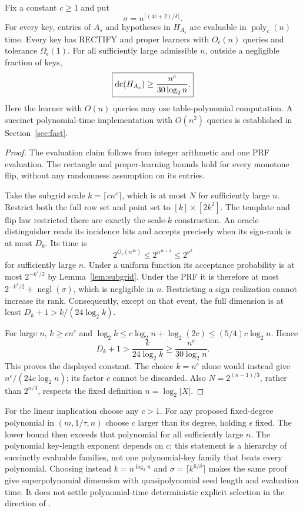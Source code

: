 \begin{samepage}
\begin{theorem}\label{thm:prf}
Fix a constant $c\ge1$ and put
\[
 \sigma=n^{\lceil(4c+2)/\delta\rceil}.
\]
For every key, entries of $A_s$ and hypotheses in $H_{A_s}$ are evaluable in $\operatorname{poly}_c(n)$ time. Every key has RECTIFY and proper learners with $O_\epsilon(n)$ queries and tolerance $\Omega_\epsilon(1)$. For all sufficiently large admissible $n$, outside a negligible fraction of keys,
\[
 \boxed{\operatorname{dc}(H_{A_s})\ge\frac{n^c}{30\log_2n}.}
\]
Here the learner with $O(n)$ queries may use table-polynomial computation. A succinct polynomial-time implementation with $O(n^2)$ queries is established in Section~\ref{sec:fast}.
\end{theorem}
\end{samepage}
\begin{proof}
The evaluation claim follows from integer arithmetic and one PRF evaluation. The rectangle and proper-learning bounds hold for every monotone flip, without any randomness assumption on its entries.

Take the subgrid scale $k=\lceil c n^c\rceil$, which is at most $N$ for sufficiently large $n$. Restrict both the full row set and point set to $[k]\times[2k^2]$. The template and flip law restricted there are exactly the scale-$k$ construction. An oracle distinguisher reads its incidence bits and accepts precisely when its sign-rank is at most $D_k$. Its time is
\[
 2^{O_c(n^{4c})}\le2^{n^{4c+2}}\le2^{\sigma^\delta}
\]
for sufficiently large $n$. Under a uniform function its acceptance probability is at most $2^{-k^4/2}$ by Lemma~\ref{lem:subgrid}. Under the PRF it is therefore at most $2^{-k^4/2}+\operatorname{negl}(\sigma)$, which is negligible in $n$. Restricting a sign realization cannot increase its rank. Consequently, except on that event, the full dimension is at least $D_k+1>k/(24\log_2k)$.

For large $n$, $k\ge c n^c$ and $\log_2k\le c\log_2n+\log_2(2c)\le(5/4)c\log_2n$. Hence
\[
 D_k+1>\frac{k}{24\log_2k}\ge\frac{n^c}{30\log_2n}.
\]
This proves the displayed constant. The choice $k=n^c$ alone would instead give $n^c/(24c\log_2n)$; its factor $c$ cannot be discarded. Also $N=2^{(n-1)/3}$, rather than $2^{n/3}$, respects the fixed definition $n=\log_2|X|$.
\end{proof}

For the linear implication choose any $c>1$. For any proposed fixed-degree polynomial in $(m,1/\tau,n)$ choose $c$ larger than its degree, holding $\epsilon$ fixed. The lower bound then exceeds that polynomial for all sufficiently large $n$. The polynomial key-length exponent depends on $c$; this statement is a hierarchy of succinctly evaluable families, not one polynomial-key family that beats every polynomial. Choosing instead $k=n^{\log_2n}$ and $\sigma=\lceil k^{6/\delta}\rceil$ makes the same proof give superpolynomial dimension with quasipolynomial seed length and evaluation time. It does not settle polynomial-time deterministic explicit selection in the direction of \citet[Problem~4.1]{HHPTZ22}.

